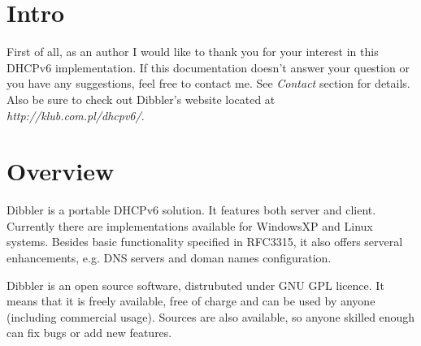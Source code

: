 \section{Intro}
First of all, as an author I would like to thank you for your interest
in this DHCPv6 implementation. If this documentation doesn't answer
your question or you have any suggestions, feel free to contact
me. See \emph{Contact} section for details. Also be sure to check out
Dibbler's website located at \emph{http://klub.com.pl/dhcpv6/}.

\section{Overview}

Dibbler is a portable DHCPv6 solution. It features both server and
client. Currently there are implementations available for WindowsXP
and Linux systems. Besides basic functionality specified in RFC3315,
it also offers serveral enhancements, e.g. DNS servers and doman names
configuration.

Dibbler is an open source software, distrubuted under GNU GPL
licence. It means that it is freely available, free of charge and can
be used by anyone (including commercial usage). Sources are also
available, so anyone skilled enough can fix bugs or add new features.

